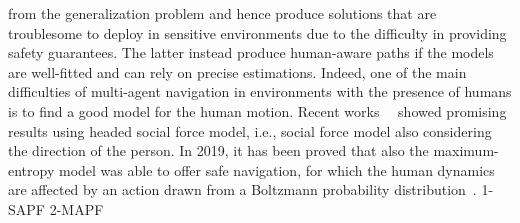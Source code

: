 from the generalization problem and hence produce solutions that are 
troublesome to deploy in sensitive environments due to the difficulty in 
providing safety guarantees. The latter instead produce human-aware paths if 
the models are well-fitted and can rely on precise estimations. Indeed, one of 
the main difficulties of multi-agent navigation in environments with the 
presence of humans is to find a good model for the human motion. Recent
works~\cite{bevilacqua2018}~\cite{conflict_detection} showed promising results
using headed social force model, i.e., social force model also considering the
direction of the person. In 2019, it has been proved that also the
maximum-entropy model was able to offer safe navigation, for which the human
dynamics are affected by an action drawn from a Boltzmann probability
distribution~\cite{bajcsy2019}.
%
%
%
{1-SAPF}
{2-MAPF}
